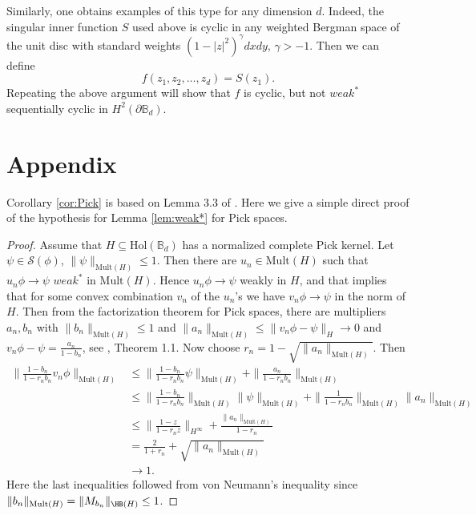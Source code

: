 \documentclass{article}
\numberwithin{equation}{section}
\newcommand{\MH}{\mathrm{Mult}( H)}
\newcommand{\Bd}{\mathbb B_d}
\begin{document}
Similarly, one obtains examples of this type  for any dimension $d$. Indeed, the singular inner function $S$ used above is cyclic in any weighted Bergman space of the unit disc with standard weights $(1-|z|^2)^\gamma dxdy$, $\gamma>-1$. Then we can define
\[
f(z_{1}, z_{2}, \dots, z_{d})
=
S(z_{1}).
\]
Repeating the above argument will show that $f$ is cyclic, but not $weak^\ast$ sequentially cyclic in $H^{2}(\partial \mathbb{B}_{d})$.


\section{Appendix}

Corollary \ref{cor:Pick} is based on Lemma 3.3 of \cite{AlemanHartzMcCarthyRichter2019}. Here we give a simple direct proof of the hypothesis for Lemma \ref{lem:weak*} for  Pick spaces.

\begin{proof} Assume that $H\subseteq {\mathrm{Hol}(\Bd)}$ has a normalized complete Pick kernel. Let $\psi \in \mathcal S(\phi)$, $\|\psi\|_{\MH}\le 1$. Then there are $u_n\in \MH$ such that $u_n\phi\to \psi$ $weak^\ast$ in $\MH$. Hence  $u_n\phi\to \psi$ weakly in $H$, and that implies that for some convex combination $v_n$ of the $u_n$'s we have $v_n\phi\to \psi $ in the norm of $H$. Then from the factorization theorem for Pick spaces, there are multipliers $a_n, b_n$ with $\|b_n\|_{\MH} \le 1$ and $\|a_n\|_{\MH} \le \|v_n\phi-\psi\|_H \to 0$ and $v_n\phi-\psi= \frac{a_n}{1-b_n}$, see \cite{AlemanHartzMcCarthyRichter2017}, Theorem 1.1. Now choose $r_n= 1-\sqrt{\|a_n\|_{\MH}}$.  Then
\begin{align*}
\|\frac{1-b_n}{1-r_nb_n} v_n \phi\|_{\MH}
&\le \| \frac{1-b_n}{1-r_nb_n}\psi\|_{\MH} +\| \frac{a_n}{1-r_nb_n}\|_{\MH}\\ 
& \le  \| \frac{1-b_n}{1-r_nb_n}\|_{\MH}\|\psi\|_{\MH} +   \| \frac{1}{1-r_n b_n}\|_{\MH} \| a_n\|_{\MH}\\
&\le \|\frac{1-z}{1-r_nz}\|_{H^\infty}+ \frac{\| a_n\|_{\MH}}{1-r_n}\\
&=\frac{2}{1+r_n}+\sqrt{\| a_n\|_{\MH}}\\
&\to 1.
 \end{align*} 
Here the last inequalities followed from von Neumann's inequality since 
$\|b_n\|_{\MH}=\|M_{b_n}\|_{\HB(H)}\le 1$. 

\end{proof}



  
 
\end{document}
